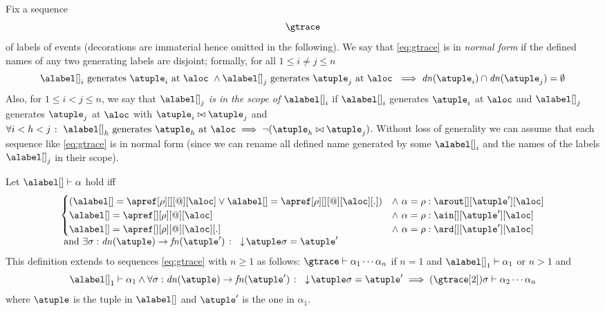 Fix a sequence
\begin{align}
  \label{eq:gtrace}
  \gtrace  
\end{align}
of labels of events (decorations are immaterial hence omitted in the
following).
%
We say that \eqref{eq:gtrace} is in \emph{normal form} if the defined
names of any two generating labels are disjoint; formally, for all
$1 \leq i \neq j \leq n$
%
\[
  \alabel[]_i \text{ generates
  $\atuple_i$ at $\aloc$ } \land \alabel[]_j \text{ generates
  $\atuple_j$ at $\aloc$ } \implies \dn{\atuple_i} \cap \dn{\atuple_j}
= \emptyset
\]
%
Also, for $1 \leq i < j \leq n$, we say that $\alabel[]_j$ \emph{is in
  the scope of $\alabel[]_i$} if $\alabel[]_i$ generates $\atuple_i$
at $\aloc$ and $\alabel[]_j$ generates $\atuple_j$ at $\aloc$ with
$\atuple_i \matches \atuple_j$ and
$\forall i < h < j \qst \alabel[]_h \text{ generates } \atuple_h
\text{ at } \aloc \implies \neg(\atuple_h \matches \atuple_j)$.
%
Without loss of generality we can assume that each sequence like
\eqref{eq:gtrace} is in normal form (since we can rename all defined
name generated by some $\alabel[]_i$ and the names of the labels
$\alabel[]_j$ in their scope).

Let $\alabel[] \vdash \alpha$ hold iff
\[\begin{array}{l}
  \begin{cases}
    (\alabel[] = \apref[\arole][][@][\aloc] \vee \alabel[] = \apref[\arole][][@][\aloc][.]) & \land\ \alpha = \arole : \arout[][\atuple'][\aloc]
    \\
    \alabel[] = \apref[][\arole][@][\aloc] & \land\ \alpha = \arole : \ain[][\atuple'][\aloc]
    \\
    \alabel[] = \apref[][\arole][@][\aloc][.] & \land\ \alpha = \arole : \ard[][\atuple'][\aloc]
  \end{cases}
    \\
  \text{ and }
  \exists \sigma: \dn{\atuple} \to \fn{\atuple'} \qst \eraseB{\atuple}\sigma = \atuple'
  \end{array}
\]
This definition extends to sequences \eqref{eq:gtrace} with $n \geq 1$
as follows:
$\gtrace \vdash \alpha_1 \cdots \alpha_n$ if
$n = 1$  and $\alabel[]_1 \vdash \alpha_1$ or
$n > 1$ and
\[
  \alabel[]_1 \vdash \alpha_1 \land  \forall \sigma: \dn{\atuple} \to \fn{\atuple'} \qst \eraseB{\atuple}\sigma = \atuple'
  \implies (\gtrace[2])\sigma \vdash \alpha_2 \cdots \alpha_n
\]
where $\atuple$ is the tuple in $\alabel[]$ and $\atuple'$ is the one in $\alpha_1$.

